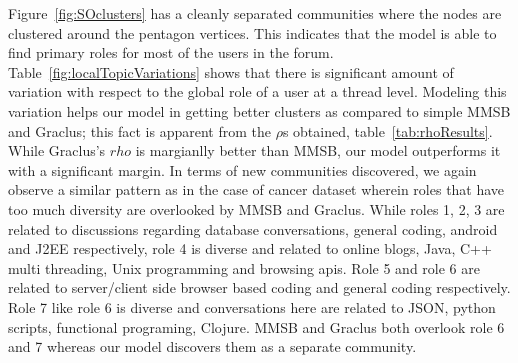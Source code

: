 \documentclass{sig-alternate}
\newcommand{\abhi}[1]{\textcolor{blue}{\\ abhi-comment: #1}}
\begin{document}
Figure~\ref{fig:SOclusters} has a cleanly separated communities
where the nodes are clustered
around the pentagon vertices. This indicates that the model is able to find
primary roles for most of the users in the forum.  
Table~\ref{fig:localTopicVariations} shows that there is significant amount of
variation with respect to the global role of a user at a thread level. 
Modeling this variation helps our model in
getting better clusters as compared to simple MMSB and Graclus; 
this fact is apparent from
the $\rho$s obtained, table~\ref{tab:rhoResults}. 
While Graclus's $rho$ is margianlly better than MMSB, our model outperforms
it with a significant margin. 
In terms of new communities discovered, we again observe a similar pattern
as in the case of cancer dataset wherein roles that have too much diversity 
are overlooked by MMSB and Graclus. 
While roles 1, 2, 3 are related to discussions regarding database 
conversations, general coding, android
and J2EE respectively, role 4 is diverse and related to 
online blogs, Java, C++ multi threading, Unix programming and browsing apis. 
Role 5 and role 6 are related to server/client side browser based 
coding and general coding respectively. Role 7 like role 6 is diverse and 
conversations here are related to JSON, python scripts, functional programing,
Clojure. MMSB and Graclus both overlook role 6 and 7 whereas our model
discovers them as a separate community.

\end{document}
